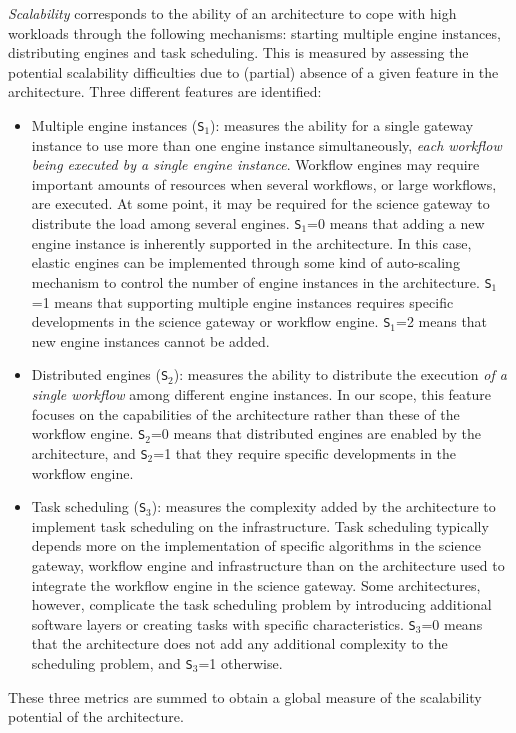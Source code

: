 \documentclass[preprint,3p,twocolumn]{elsarticle}
\newcommand{\correction}[1]{\color{blue}#1\color{black}\xspace}
\begin{document}
\emph{Scalability} corresponds to the ability of an architecture to
cope with high workloads through the following mechanisms: starting multiple engine instances, distributing engines and task scheduling. 
This is measured by assessing the potential
scalability difficulties due to (partial) absence of a given feature in the architecture.  
 Three different features are identified:
\begin{itemize}[leftmargin=0cm,itemindent=0.35cm,itemsep=0cm]
\item Multiple engine instances (\texttt{S$_1$}): measures the
  \correction{ability} for a single gateway instance to use more than
  one engine instance simultaneously, \correction{\emph{each workflow
      being executed by a single engine instance}}.  Workflow engines
  may require important amounts of resources when several workflows,
  or large workflows, are executed. At some point, it may be required
  for the science gateway to distribute the load among several
  engines. \texttt{S$_1$}=0 means that adding a new engine instance is
  inherently supported in the architecture. In this case, elastic
  engines can be implemented through some kind of auto-scaling
  mechanism to control the number of engine instances in the
  architecture. \texttt{S$_1$}=1 means that supporting multiple engine
  instances requires specific developments in the science gateway or
  workflow engine. \texttt{S$_1$}=2 means that new engine instances
  cannot be added.
\item Distributed engines (\texttt{S$_2$}): measures the \correction{ability to distribute}
  the execution \emph{of a single workflow} among different engine
  instances. In our scope, this feature focuses on the capabilities of
  the architecture rather than these of the workflow
  engine. \texttt{S$_2$}=0 means that distributed engines are enabled by
  the architecture, and \texttt{S$_2$}=1 that they require specific
  developments in the workflow engine. 
\item Task scheduling (\texttt{S$_3$}): measures the complexity
  added by the architecture to implement task scheduling on
  the infrastructure. Task
  scheduling typically depends more on the implementation of specific
  algorithms in the science gateway, workflow engine and
  infrastructure than on the architecture used to integrate the
  workflow engine in the science gateway. Some architectures, however,
  complicate the task scheduling problem by introducing additional
  software layers or creating tasks with specific
  characteristics. \texttt{S$_3$}=0 means that the architecture does
  not add any additional complexity to the scheduling problem,
  and \texttt{S$_3$}=1 otherwise.
\end{itemize}
These three metrics are summed to obtain a global measure of the scalability
potential of the architecture.
\end{document}
